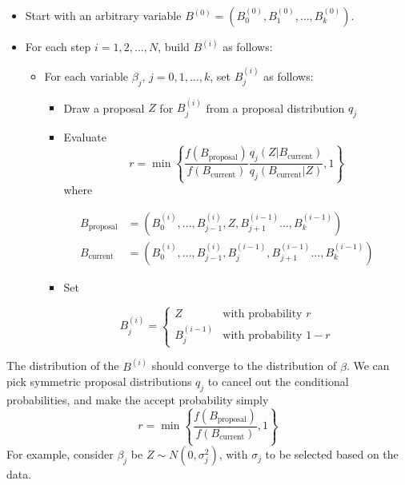 \begin{itemize}[tightlist]
\item
  Start with an arbitrary variable
  \(B^{(0)} = (B^{(0)}_{0}, B^{(0)}_{1}, \dots, B^{(0)}_{k})\).
\item
  For each step \(i = 1, 2, \dots, N\), build \(B^{(i)}\) as follows:
  \begin{itemize}
  \item
    For each variable \(\beta_{j}\), \(j = 0, 1, \dots, k\), set
\(B_{j}^{(i)}\) as follows:
    \begin{itemize}[tightlist]
    \item
      Draw a proposal \(Z\) for \(B_{j}^{(i)}\) from a proposal
      distribution \(q_{j}\)
    \item
      Evaluate
      \[
r = \min \left\{ \frac{f\left(B_\text{proposal}\right)}{f\left(B_\text{current}\right)} \frac{q_{j}(Z | B_\text{current})}{q_{j}(B_\text{current} | Z)}, 1\right\}
\]
      where
    \end{itemize}
     \begin{align*}
     B_\text{proposal} &= \left(B_{0}^{(i)}, \dots, B_{j-1}^{(i)}, Z, B_{j + 1}^{(i - 1)} \dots, B_{k}^{(i - 1)}\right) \\
     B_\text{current} &= \left(B_{0}^{(i)}, \dots, B_{j-1}^{(i)}, B_{j}^{(i - 1)}, B_{j + 1}^{(i - 1)} \dots, B_{k}^{(i - 1)}\right)
     \end{align*}
    \begin{itemize}[tightlist]
    \item
      Set
    \end{itemize}
    \[
     B_{j}^{(i)} = \begin{cases}
     Z &\text{with probability } r \\
     B_{j}^{(i - 1)} &\text{with probability } 1 - r
     \end{cases}
\]
  \end{itemize}
\end{itemize}
The distribution of the \(B^{(i)}\) should converge to the distribution
of \(\beta\).
We can pick symmetric proposal distributions \(q_{j}\) to cancel out the
conditional probabilities, and make the accept probability simply
\[
r = \min \left\{ \frac{f\left(B_\text{proposal}\right)}{f\left(B_\text{current}\right)}, 1\right\}
\]
For example, consider \(\beta_{j}\) be
\(Z \sim N(0, \sigma_{j}^{2})\), with \(\sigma_{j}\) to be selected based on
the data.

